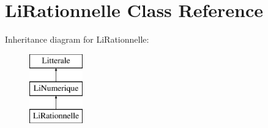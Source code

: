 \hypertarget{class_li_rationnelle}{}\section{Li\+Rationnelle Class Reference}
\label{class_li_rationnelle}
Inheritance diagram for Li\+Rationnelle\+:\begin{figure}[H]
\begin{center}
\leavevmode
\includegraphics[height=3.000000cm]{class_li_rationnelle}
\end{center}
\end{figure}
